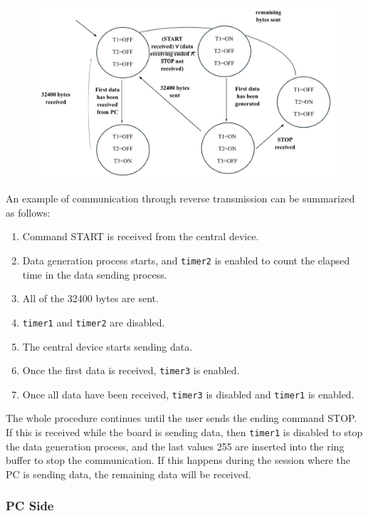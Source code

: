 \documentclass{Configuration_Files/PoliMi3i_thesis}
\begin{document}
\begin{figure}[H]
    \centering
    \includegraphics[scale=0.2]{Board Windows PC/10.png}
    \label{fig:nrf_connect_log}
\end{figure}

An example of communication through reverse transmission can be summarized as follows:

\begin{enumerate}
    \item Command START is received from the central device.
    \item Data generation process starts, and \texttt{timer2} is enabled to count the elapsed time in the data sending process.
    \item All of the 32400 bytes are sent.
    \item \texttt{timer1} and \texttt{timer2} are disabled.
    \item The central device starts sending data.
    \item Once the first data is received, \texttt{timer3} is enabled.
    \item Once all data have been received, \texttt{timer3} is disabled and \texttt{timer1} is enabled.
\end{enumerate}

The whole procedure continues until the user sends the ending command STOP. If this is received while the board is sending data, then \texttt{timer1} is disabled to stop the data generation process, and the last values 255 are inserted into the ring buffer to stop the communication. If this happens during the session where the PC is sending data, the remaining data will be received.

\subsubsection{PC Side}
\end{document}
